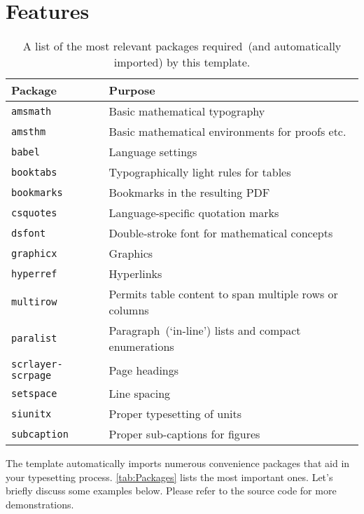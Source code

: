 \section{Features}

\begin{table}
  \centering
  \begin{tabular}{ll}
    \toprule
    \textbf{Package}      & \textbf{Purpose}\\
    \midrule
      \texttt{amsmath}          & Basic mathematical typography\\
      \texttt{amsthm}           & Basic mathematical environments for proofs etc.\\
      \texttt{babel}            & Language settings\\
      \texttt{booktabs}         & Typographically light rules for tables\\
      \texttt{bookmarks}        & Bookmarks in the resulting PDF\\
      \texttt{csquotes}         & Language-specific quotation marks\\
      \texttt{dsfont}           & Double-stroke font for mathematical concepts\\
      \texttt{graphicx}         & Graphics\\
      \texttt{hyperref}         & Hyperlinks\\
      \texttt{multirow}         & Permits table content to span multiple rows or columns\\ 
      \texttt{paralist}         & Paragraph~(`in-line') lists and compact enumerations\\
      \texttt{scrlayer-scrpage} & Page headings\\
      \texttt{setspace}         & Line spacing\\
      \texttt{siunitx}          & Proper typesetting of units\\
      \texttt{subcaption} & Proper sub-captions for figures\\
    \bottomrule
  \end{tabular}
  \caption{%
    A list of the most relevant packages required~(and automatically imported) by this template.
  }
  \label{tab:Packages}
\end{table}

The template automatically imports numerous convenience packages that
aid in your typesetting process. \autoref{tab:Packages} lists the
most important ones. Let's briefly discuss some examples below. Please
refer to the source code for more demonstrations.

